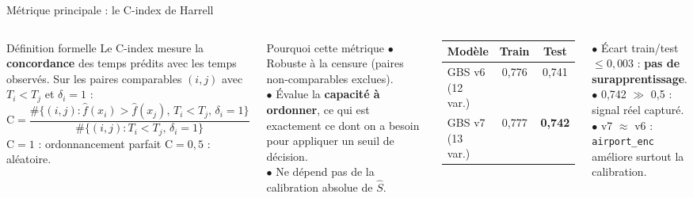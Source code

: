 \documentclass[aspectratio=169,t,11pt]{beamer}
\begin{document}
\begin{frame}{Métrique principale : le C-index de Harrell}
\vspace{-2pt}
\begin{columns}[T]

\begin{block}{Définition formelle}
\small
Le C-index mesure la \textbf{concordance} des temps prédits avec les temps observés.
Sur les paires comparables $(i,j)$ avec $T_i < T_j$ et $\delta_i = 1$ :
\[
\mathrm{C} = \frac{\#\{(i,j) : \hat{f}(x_i) > \hat{f}(x_j),\, T_i < T_j,\, \delta_i = 1\}}
                 {\#\{(i,j) : T_i < T_j,\, \delta_i = 1\}}
\]
$\mathrm{C} = 1$ : ordonnancement parfait \quad $\mathrm{C} = 0{,}5$ : aléatoire.
\end{block}
\vspace{3pt}
\begin{exampleblock}{Pourquoi cette métrique}
\footnotesize
$\bullet$ Robuste à la censure (paires non-comparables exclues).\\
$\bullet$ Évalue la \textbf{capacité à ordonner}, ce qui est exactement
ce dont on a besoin pour appliquer un seuil de décision.\\
$\bullet$ Ne dépend pas de la calibration absolue de $\hat{S}$.
\end{exampleblock}

\begin{tcolorbox}[mybox,colback=metGreen!10,colframe=metGreen,
  title={Résultats validation 2021-2022}]
\small
\centering
\begin{tabular}{lcc}
\toprule
\textbf{Modèle} & \textbf{Train} & \textbf{Test} \\
\midrule
GBS v6 (12 var.) & 0,776 & 0,741 \\
GBS v7 (13 var.) & 0,777 & \textbf{0,742} \\
\bottomrule
\end{tabular}
\end{tcolorbox}
\vspace{4pt}
\begin{tcolorbox}[mybox,colback=metMid!10,colframe=metMid,
  title={Interprétation}]
\scriptsize
$\bullet$ Écart train/test $\le 0{,}003$ : \textbf{pas de surapprentissage}.\\
$\bullet$ 0,742 $\gg$ 0,5 : signal réel capturé.\\
$\bullet$ v7 $\approx$ v6 : \texttt{airport\_enc} améliore surtout la calibration.
\end{tcolorbox}
\end{columns}
\end{frame}
\end{document}

